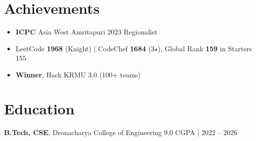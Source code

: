 \documentclass[a4paper,11pt]{article}
\begin{document}
\section*{Achievements}
\vspace{-2mm}
\begin{itemize}[left=0pt]
    \item \textbf{ICPC} Asia West Amritapuri 2023 Regionalist
    \item LeetCode \textbf{1968} (Knight) $\vert$ CodeChef \textbf{1684} (3$\star$), Global Rank \textbf{159} in Starters 155
    \item \textbf{Winner}, Hack KRMU 3.0 (100+ teams)
\end{itemize}
\vspace{-5mm}

\section*{Education}
\vspace{-2mm}
\noindent\textbf{B.Tech, CSE}, Dronacharya College of Engineering \hfill 9.0 CGPA $\vert$ 2022 -- 2026

\vspace*{\fill}
\end{document}
